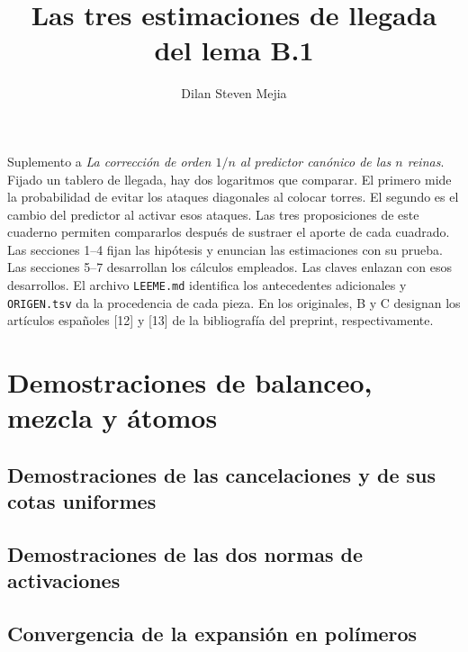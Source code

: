 \documentclass[11pt,a4paper]{article}
\title{Las tres estimaciones de llegada\\del lema B.1}
\author{Dilan Steven Mejia}
\date{}
\newcommand{\pieza}[1]{\begingroup
  \renewcommand{\section}[1]{\subsection{##1}\label{pieza:#1}%
    \noindent{\small\textsf{Fuente #1}}\par\nobreak\smallskip}
  \endgroup}
\begin{document}
\maketitle
\noindent Suplemento a \emph{La corrección de orden \(1/n\) al predictor canónico de las \(n\) reinas}.
Fijado un tablero de llegada, hay dos logaritmos que comparar. El primero mide
la probabilidad de evitar los ataques diagonales al colocar torres. El segundo es el cambio
del predictor al activar esos ataques. Las tres proposiciones de este cuaderno permiten
compararlos después de sustraer el aporte de cada cuadrado.
\tableofcontents
\smallskip
\noindent Las secciones 1--4 fijan las hipótesis y enuncian las estimaciones con su prueba.
Las secciones 5--7 desarrollan los cálculos empleados. Las claves enlazan con esos
desarrollos. El archivo \texttt{LEEME.md} identifica los antecedentes adicionales y
\texttt{ORIGEN.tsv} da la procedencia de cada pieza. En los originales, B y C designan
los artículos españoles [12] y [13] de la bibliografía del preprint, respectivamente.




\clearpage
\section{Demostraciones de balanceo, mezcla y átomos}
\pieza{D04}
\pieza{U02}
\pieza{V01}
\pieza{U03}
\pieza{U04}
\pieza{U07}
\pieza{A03}
\clearpage
\section{Demostraciones de las cancelaciones y de sus cotas uniformes}
\pieza{B01}
\pieza{B02}
\pieza{G02}
\pieza{G03}
\pieza{G04}
\pieza{P03}
\pieza{P04}
\pieza{X02}
\pieza{Z01}
\pieza{Z02}
\pieza{P05}
\pieza{X03}
\pieza{V07}
\clearpage
\section{Demostraciones de las dos normas de activaciones}
\pieza{V02}
\pieza{F04}
\pieza{V03}
\begingroup
\subsection{Convergencia de la expansión en polímeros}\label{pieza:V03b}
\par\nobreak\smallskip

\endgroup
\pieza{N02}
\pieza{N03}
\pieza{Z04}
\end{document}
